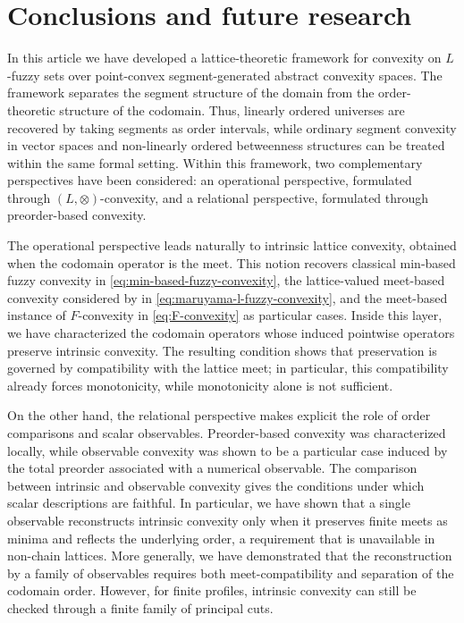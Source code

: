 \documentclass[11pt,a4paper]{article}
\begin{document}





\section{Conclusions and future research}\label{sec:conclusions}

In this article we have developed a lattice-theoretic framework for convexity on \(L\)-fuzzy sets over point-convex segment-generated abstract convexity spaces. The framework separates the segment structure of the domain from the order-theoretic structure of the codomain. Thus, linearly ordered universes are recovered by taking segments as order intervals, while ordinary segment convexity in vector spaces and non-linearly ordered betweenness structures can be treated within the same formal setting. Within this framework, two complementary perspectives have been considered: an operational perspective, formulated through \((L,\otimes)\)-convexity, and a relational perspective, formulated through preorder-based convexity.

\smallskip

The operational perspective leads naturally to intrinsic lattice convexity, obtained when the codomain operator is the meet. This notion recovers classical min-based fuzzy convexity in \eqref{eq:min-based-fuzzy-convexity}, the lattice-valued meet-based convexity considered by \citet{Maruyama2009} in \eqref{eq:maruyama-l-fuzzy-convexity}, and the meet-based instance of \(F\)-convexity in \eqref{eq:F-convexity} as particular cases. Inside this layer, we have characterized the codomain operators whose induced pointwise operators preserve intrinsic convexity. The resulting condition shows that preservation is governed by compatibility with the lattice meet; in particular, this compatibility already forces monotonicity, while monotonicity alone is not sufficient.


\smallskip

On the other hand, the relational perspective makes explicit the role of order comparisons and scalar observables. Preorder-based convexity was characterized locally, while observable convexity was shown to be a particular case induced by the total preorder associated with a numerical observable. The comparison between intrinsic and observable convexity gives the conditions under which scalar descriptions are faithful. In particular, we have shown that a single observable reconstructs intrinsic convexity only when it preserves finite meets as minima and reflects the underlying order, a requirement that is unavailable in non-chain lattices. More generally, we have demonstrated that the reconstruction by a family of observables requires both meet-compatibility and separation of the codomain order. However, for finite profiles, intrinsic convexity can still be checked through a finite family of principal cuts.
\end{document}
